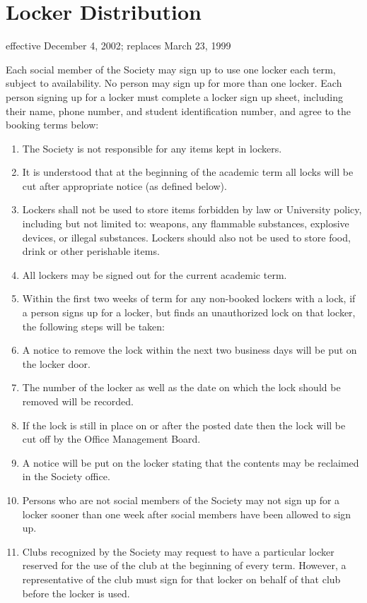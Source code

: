 \section{Locker Distribution}
effective December 4, 2002; replaces March 23, 1999

Each social member of the Society may sign up to use one locker each term, subject to availability.
No person may sign up for more than one locker.
Each person signing up for a locker must complete a locker sign up sheet, including their name, phone number, and student identification number, and agree to the booking terms below:
\begin{enumerate}
\item The Society is not responsible for any items kept in lockers.
\item It is understood that at the beginning of the academic term all locks will be cut after appropriate notice (as defined below).
\item Lockers shall not be used to store items forbidden by law or University policy, including but not limited to: weapons, any flammable substances, explosive devices, or illegal substances. Lockers should also not be used to store food, drink or other perishable items.
\item All lockers may be signed out for the current academic term.
\item Within the first two weeks of term for any non-booked lockers with a lock, if a person signs up for a locker, but finds an unauthorized lock on that locker, the following steps will be taken:
\item A notice to remove the lock within the next two business days will be put on the locker door.
\item The number of the locker as well as the date on which the lock should be removed will be recorded.
\item If the lock is still in place on or after the posted date then the lock will be cut off by the Office Management Board.
\item A notice will be put on the locker stating that the contents may be reclaimed in the Society office.
\item Persons who are not social members of the Society may not sign up for a locker sooner than one week after social members have been allowed to sign up.
\item Clubs recognized by the Society may request to have a particular locker reserved for the use of the club at the beginning of every term. However, a representative of the club must sign for that locker on behalf of that club before the locker is used.
\end{enumerate}
